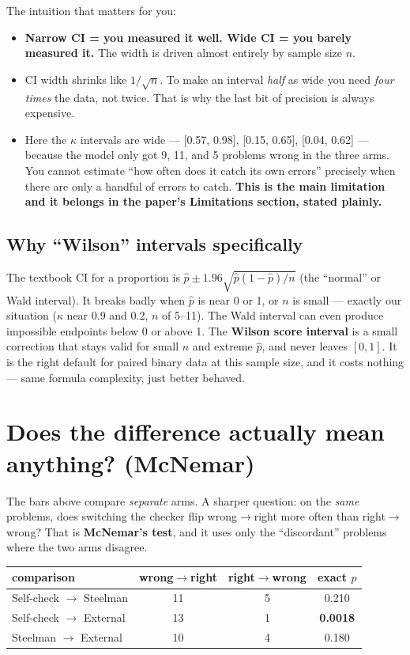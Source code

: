 \documentclass[11pt]{article}
\begin{document}
The intuition that matters for you:
\begin{itemize}[leftmargin=1.4em]
\item \textbf{Narrow CI = you measured it well. Wide CI = you barely measured it.} The width is driven almost entirely by sample size $n$.
\item CI width shrinks like $1/\sqrt{n}$. To make an interval \emph{half} as wide you need \emph{four times} the data, not twice. That is why the last bit of precision is always expensive.
\item Here the $\kappa$ intervals are wide --- [0.57, 0.98], [0.15, 0.65], [0.04, 0.62] --- because the model only got 9, 11, and 5 problems wrong in the three arms. You cannot estimate ``how often does it catch its own errors'' precisely when there are only a handful of errors to catch. \textbf{This is the main limitation and it belongs in the paper's Limitations section, stated plainly.}
\end{itemize}

\subsection*{Why ``Wilson'' intervals specifically}
The textbook CI for a proportion is $\hat p \pm 1.96\sqrt{\hat p(1-\hat p)/n}$ (the ``normal'' or Wald interval). It breaks badly when $\hat p$ is near 0 or 1, or $n$ is small --- exactly our situation ($\kappa$ near 0.9 and 0.2, $n$ of 5--11). The Wald interval can even produce impossible endpoints below 0 or above 1. The \textbf{Wilson score interval} is a small correction that stays valid for small $n$ and extreme $\hat p$, and never leaves $[0,1]$. It is the right default for paired binary data at this sample size, and it costs nothing --- same formula complexity, just better behaved.

\section*{Does the difference actually mean anything? (McNemar)}
The bars above compare \emph{separate} arms. A sharper question: on the \emph{same} problems, does switching the checker flip wrong$\to$right more often than right$\to$wrong? That is \textbf{McNemar's test}, and it uses only the ``discordant'' problems where the two arms disagree.

\begin{center}
\begin{tabular}{lccc}
\toprule
comparison & wrong$\to$right & right$\to$wrong & exact $p$ \\
\midrule
Self-check $\to$ Steelman & 11 & 5 & 0.210 \\
Self-check $\to$ External & 13 & 1 & \textbf{0.0018} \\
Steelman $\to$ External   & 10 & 4 & 0.180 \\
\bottomrule
\end{tabular}
\end{center}
\end{document}
